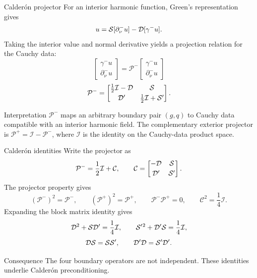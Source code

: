 \documentclass[aspectratio=169,11pt]{beamer}
\begin{document}
\begin{frame}{Calder\'on projector}
\small
For an interior harmonic function, Green's representation gives
\[
  u=\mathcal{S}[\partial_\nu^- u]-\mathcal{D}[\gamma^-u].
\]
Taking the interior value and normal derivative yields a projection relation
for the Cauchy data:
\[
  \begin{bmatrix}
  \gamma^-u\\[0.15em]
  \partial_\nu^- u
  \end{bmatrix}
  =
  \mathcal P^-
  \begin{bmatrix}
  \gamma^-u\\[0.15em]
  \partial_\nu^- u
  \end{bmatrix}
\]
\[
  \mathcal P^-=
  \begin{bmatrix}
  \frac12\mathcal{I}-\mathcal{D} & \mathcal{S}\\[0.25em]
  \mathcal{D}^{\prime} & \frac12\mathcal{I}+\mathcal{S}^{\prime}
  \end{bmatrix}.
\]

\begin{block}{Interpretation}
$\mathcal P^-$ maps an arbitrary boundary pair $(g,q)$ to Cauchy data
compatible with an interior harmonic field.  The complementary exterior
projector is $\mathcal P^+=\mathcal I-\mathcal P^-$, where $\mathcal I$ is the
identity on the Cauchy-data product space.
\end{block}
\end{frame}

\begin{frame}{Calder\'on identities}
\small
Write the projector as
\[
  \mathcal P^-=\frac12\mathcal I+\mathcal C,
  \qquad
  \mathcal C=
  \begin{bmatrix}
  -\mathcal{D} & \mathcal{S}\\[0.25em]
  \mathcal{D}^{\prime} & \mathcal{S}^{\prime}
  \end{bmatrix}.
\]
The projector property gives
\[
  (\mathcal P^-)^2=\mathcal P^-,
  \qquad
  (\mathcal P^+)^2=\mathcal P^+,
  \qquad
  \mathcal P^-\mathcal P^+=0,
  \qquad
  \mathcal C^2=\frac14\mathcal I .
\]
Expanding the block matrix identity gives
\[
\mathcal{D}^2+\mathcal{S}\mathcal{D}^{\prime}=\frac14\mathcal{I},\qquad
\mathcal{S}^{\prime}{}^2+\mathcal{D}^{\prime}\mathcal{S}=\frac14\mathcal{I},
\]
\[
\mathcal{D}\mathcal{S}=\mathcal{S}\mathcal{S}^{\prime},\qquad
\mathcal{D}^{\prime}\mathcal{D}=\mathcal{S}^{\prime}\mathcal{D}^{\prime}.
\]

\begin{block}{Consequence}
The four boundary operators are not independent.  These identities underlie
Calder\'on preconditioning.
\end{block}
\end{frame}
\end{document}
